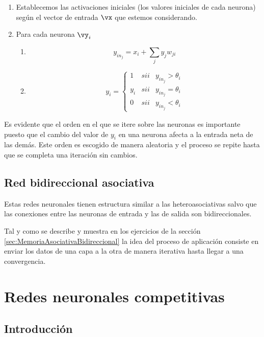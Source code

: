 \begin{enumerate}
\item Establecemos las activaciones iniciales (los valores iniciales de cada neurona) según el vector de entrada $\vx$ que estemos considerando.
\item Para cada neurona $\vy_i$
\begin{enumerate}
\item \[y_{in_j} = x_i +\sum_j y_jw_{ji}\]
\item \[y_i = \left\{ \begin{array}{lll}
1 & sii & y_{in_j}> \theta_i \\
y_i & sii & y_{in_j} = \theta_i \\
0 & sii & y_{in_j}<\theta_i
\end{array}\right.\]
\end{enumerate}
\end{enumerate}

Es evidente que el orden en el que se itere sobre las neuronas es importante puesto que el cambio del valor de $y_i$ en una neurona afecta a la entrada neta de las demás. Este orden es escogido de manera aleatoria y el proceso se repite hasta que se completa una iteración sin cambios.

\subsection{Red bidireccional asociativa}
\begin{defn}
Estas redes neuronales tienen estructura similar a las heteroasociativas salvo que las conexiones entre las neuronas de entrada y las de salida son bidireccionales.

Tal y como se describe y muestra en los ejercicios de la sección \ref{sec:MemoriaAsociativaBidireccional} la idea del proceso de aplicación consiste en enviar los datos de una capa a la otra de manera iterativa hasta llegar a una convergencia.
\end{defn}


\section{Redes neuronales competitivas}
\subsection{Introducción}

